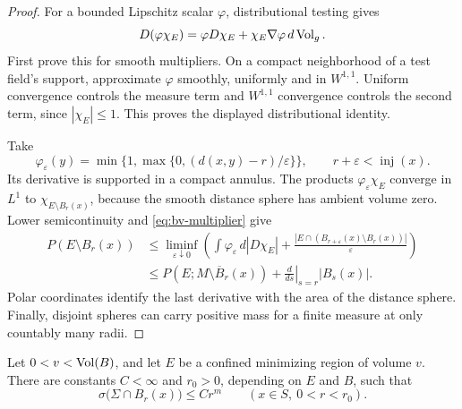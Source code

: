 \begin{proof}
For a bounded Lipschitz scalar $\varphi$, distributional testing gives
\begin{equation}\label{eq:bv-multiplier}
 D(\varphi\chi_E)=\varphi D\chi_E+
                  \chi_E\nabla\varphi\,d\operatorname{Vol}_g.
\end{equation}
First prove this for smooth multipliers. On a compact neighborhood of
a test field's support, approximate $\varphi$ smoothly, uniformly and
in $W^{1,1}$. Uniform convergence controls the measure term and
$W^{1,1}$ convergence controls the second term, since $|\chi_E|\le1$.
This proves the displayed distributional identity.

Take
\[
 \varphi_\varepsilon(y)=
 \min\{1,\max\{0,(d(x,y)-r)/\varepsilon\}\},
 \qquad r+\varepsilon<\operatorname{inj}(x).
\]
Its derivative is supported in a compact annulus. The products
$\varphi_\varepsilon\chi_E$ converge in $L^1$ to
$\chi_{E\setminus B_r(x)}$, because the smooth distance sphere has
ambient volume zero. Lower semicontinuity and
\eqref{eq:bv-multiplier} give
\[
 \begin{split}
 P(E\setminus B_r(x))
 &\le\liminf_{\varepsilon\downarrow0}
 \left(\int\varphi_\varepsilon\,d|D\chi_E|
       +\frac{|E\cap(B_{r+\varepsilon}(x)\setminus B_r(x))|}
                    {\varepsilon}\right)\\
 &\le P(E;M\setminus\overline B_r(x))
       +\left.\frac d{ds}\right|_{s=r}|B_s(x)|.
 \end{split}
\]
Polar coordinates identify the last derivative with the area of the
distance sphere. Finally, disjoint spheres can carry positive mass
for a finite measure at only countably many radii.
\end{proof}

\begin{lemma}
\label{lem:area-growth}
Let $0<v<\operatorname{Vol}(B)$, and let $E$ be a confined minimizing region of
volume $v$.  There are constants $C<\infty$ and $r_0>0$, depending on
$E$ and $B$, such that
\begin{equation}
\label{eq:singular-area-growth}
 \sigma\bigl(\Sigma\cap B_r(x)\bigr)\le Cr^m
 \qquad(x\in S,\ 0<r<r_0).
\end{equation}
\end{lemma}

